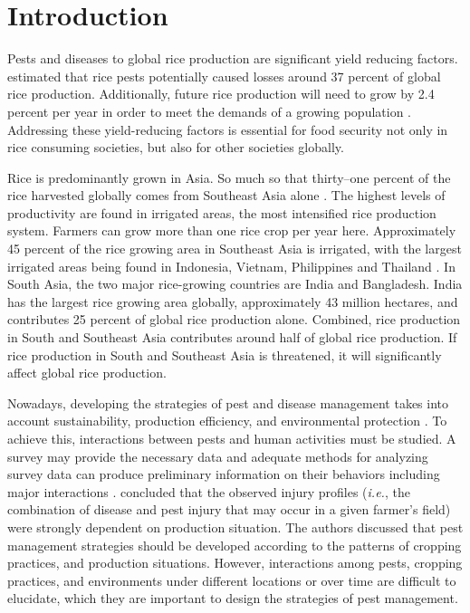 \section{Introduction}

Pests and diseases to global rice production are significant yield reducing factors. \citet{Oerke_2005_Crop} estimated that rice pests potentially caused losses around 37 percent of global rice production. Additionally, future rice production will need to grow by 2.4 percent per year in order to meet the demands of a growing population \cite{Ray_2013_Yield}. Addressing these yield-reducing factors is essential for food security not only in rice consuming societies, but also for other societies globally.

Rice is predominantly grown in Asia. So much so that thirty--one percent of the rice harvested globally comes from Southeast Asia alone  \citep{oecd_2012_Agriculture}. The highest levels of productivity are found in irrigated areas, the most intensified rice production system. Farmers can grow more than one rice crop per year here. Approximately 45 percent of the rice growing area in Southeast Asia is irrigated, with the largest irrigated areas being found in Indonesia, Vietnam, Philippines and Thailand \citep{Mutert_2002_Developments}. In South Asia, the two major rice-growing countries are India and Bangladesh. India has the largest rice growing area globally, approximately 43 million hectares, and contributes 25 percent of global rice production alone. Combined, rice production in South and Southeast Asia contributes around half of global rice production. If rice production in South and Southeast Asia is threatened, it will significantly affect global rice production. 

Nowadays, developing the strategies of pest and disease management takes into account sustainability, production efficiency, and environmental protection \citep{Mew_2004_Looking}. To achieve this, interactions between pests and human activities must be studied. A survey may provide the necessary data and adequate methods for analyzing survey data can produce preliminary information on their behaviors including major interactions \citep{Savary_1995_Use}. \citet{Savary_2000_Characterization} concluded that the observed injury profiles (\textit{i.e.}, the combination of disease and pest injury that may occur in a given farmer's field) were strongly dependent on production situation.  The authors discussed that pest management strategies should be developed according to the patterns of cropping practices, and production situations. However, interactions among pests, cropping practices, and environments under different locations or over time are difficult to elucidate, which they are important to design the strategies of pest management.

